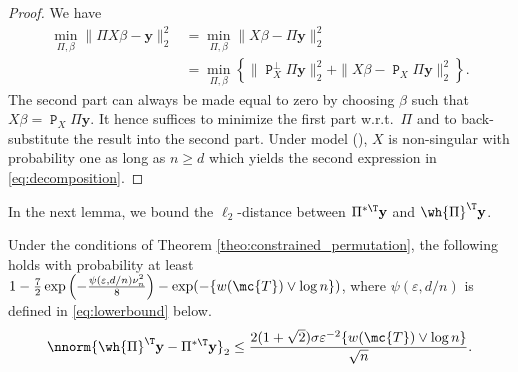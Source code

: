 \documentclass[11pt]{article}
\DeclareMathOperator{\pr}{\texttt{P}}
\def\y{\mathbf{y}}
\def\epss{\varepsilon}
\begin{document}
\begin{proof} We have 
\begin{align*}
  \min_{\Pi, \beta} \|\Pi X\beta-\y\|_2^2 &= \min_{\Pi, \beta} \|X\beta-\Pi \y\|_2^2  \\
                                        &=  \min_{\Pi, \beta} \left\{ \|\pr_X^{\perp} \Pi \y\|_2^2   +  \|X\beta- \pr_X \Pi \y\|_2^2 \right\}. 
\end{align*}
The second part can always be made equal to zero by choosing $\beta$ such that $X \beta = \pr_X \Pi \y$. It hence suffices to
minimize the first part w.r.t.~$\Pi$ and to back-substitute the result into the second part. Under model (), $X$ is
non-singular with probability one as long as $n \geq d$ which yields the second expression in \eqref{eq:decomposition}. 
\end{proof}
\noindent In the next lemma, we bound the $\ell_2$-distance between $\Pi^{*\T} \y$ and $\wh{\Pi}^{\T} \y$. 
\begin{lemma}\label{lem:bound_pi} Under the conditions of Theorem \ref{theo:constrained_permutation}, the following holds
  with probability at least $1 - \frac{7}{2} \exp \left(-\frac{\psi(\epss, d/n) \nu_n^2}{8} \right) - \exp(-\{ w(\mc{T}) \vee \log n\})$,
  where $\psi(\epss, d/n)$ is defined in \eqref{eq:lowerbound} below. 
\begin{equation*} 
\nnorm{\wh{\Pi}^{\T} \y - \Pi^{*\T} \y}_2 \leq  \frac{2 (1 + \sqrt{2})\sigma \epss^{-2} \{w(\mc{T}) \vee \log n\}}{\sqrt{n}}.
\end{equation*}
\end{lemma}
\end{document}
